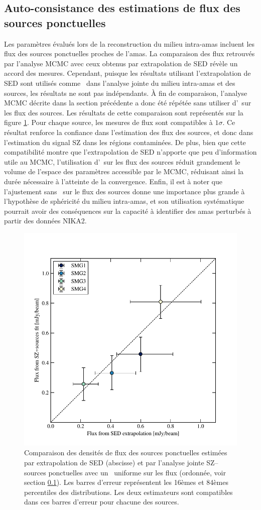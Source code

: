 \subsection{Auto-consistance des estimations de flux des sources ponctuelles}
\label{sec:act:ps_flat_prior}

Les paramètres évalués lors de la reconstruction du milieu intra-amas incluent les flux des sources ponctuelles proches de l'amas.
La comparaison des flux retrouvés par l'analyse MCMC avec ceux obtenus par extrapolation de SED révèle un accord des mesures.
Cependant, puisque les résultats utilisant l'extrapolation de SED sont utilisés comme \prior\ dans l'analyse jointe du milieu intra-amas et des sources, les résultats ne sont pas indépendants.
À fin de comparaison, l'analyse MCMC décrite dans la section précédente a donc été répétée sans utiliser d'\prior\ sur les flux des sources.
Les résultats de cette comparaison sont représentés sur la figure \ref{fig:act:pscomp}.
Pour chaque source, les mesures de flux sont compatibles à $1\sigma$.
Ce résultat renforce la confiance dans l'estimation des flux des sources, et donc dans l'estimation du signal SZ dans les régions contaminées.
De plus, bien que cette compatibilité montre que l'extrapolation de SED n'apporte que peu d'information utile au MCMC, l'utilisation d'\prior\ sur les flux des sources réduit grandement le volume de l'espace des paramètres accessible par le MCMC, réduisant ainsi la durée nécessaire à l'atteinte de la convergence.
Enfin, il est à noter que l'ajustement sans \prior\ sur le flux des sources donne une importance plus grande à l'hypothèse de sphéricité du milieu intra-amas, et son utilisation systématique pourrait avoir des conséquences sur la capacité à identifier des amas perturbés à partir des données NIKA2.

\begin{figure}
    \centering
    \includegraphics[width=0.5\linewidth, trim={.35cm .5cm .35cm 1.4cm}, clip]{Figures/Chap_actj0215/ps_fluxes_comp.pdf}
    \caption{%
        Comparaison des densités de flux des sources ponctuelles estimées par extrapolation de SED (abscisse) et par l'analyse jointe SZ--sources ponctuelles avec un \prior\ uniforme sur les flux (ordonnée, voir section \ref{sec:act:ps_flat_prior}).
        Les barres d'erreur représentent les 16èmes et 84èmes percentiles des distributions.
        Les deux estimateurs sont compatibles dans ces barres d'erreur pour chacune des sources.
    }
    \label{fig:act:pscomp}
\end{figure}


